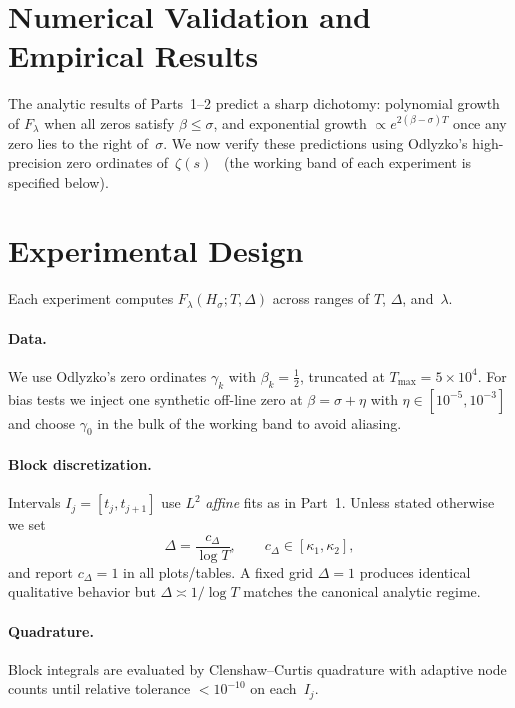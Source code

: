 
\section{Numerical Validation and Empirical Results}

The analytic results of Parts~1–2 predict a sharp dichotomy:
polynomial growth of $F_\lambda$ when all zeros satisfy $\beta\le\sigma$,
and exponential growth $\propto e^{2(\beta-\sigma)T}$ once any zero lies
to the right of~$\sigma$.  We now verify these predictions using
Odlyzko’s high-precision zero ordinates of~$\zeta(s)$~\cite{odlyzko}
(the working band of each experiment is specified below).

\section{Experimental Design}

Each experiment computes $F_\lambda(H_\sigma;T,\Delta)$
across ranges of $T$, $\Delta$, and~$\lambda$.

\paragraph{Data.}
We use Odlyzko’s zero ordinates $\gamma_k$ with $\beta_k=\tfrac12$,
truncated at $T_{\max}=5\times10^4$.
For bias tests we inject one synthetic off-line zero at
$\beta=\sigma+\eta$ with $\eta\in[10^{-5},10^{-3}]$
and choose $\gamma_0$ in the bulk of the working band to avoid aliasing.

\paragraph{Block discretization.}
Intervals $I_j=[t_j,t_{j+1}]$ use $L^2$ \emph{affine} fits as in Part~1.
Unless stated otherwise we set
\[
\Delta=\frac{c_\Delta}{\log T},\qquad c_\Delta\in[\kappa_1,\kappa_2],
\]
and report $c_\Delta=1$ in all plots/tables.
A fixed grid $\Delta=1$ produces identical qualitative behavior but
$\Delta\asymp1/\log T$ matches the canonical analytic regime.

\paragraph{Quadrature.}
Block integrals are evaluated by Clenshaw–Curtis quadrature with adaptive
node counts until relative tolerance $<10^{-10}$ on each~$I_j$.

